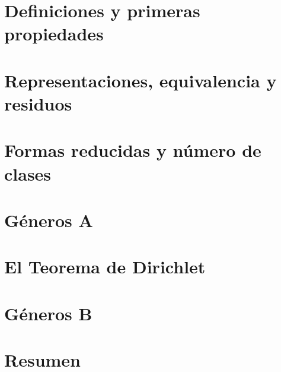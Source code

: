 \section{Definiciones y primeras propiedades}\label{sec:definiciones}


\section{Representaciones, equivalencia y residuos}\label{sec:representaciones}


\section{Formas reducidas y n\'umero de clases}\label{sec:reducidas}


\section{G\'eneros A}\label{sec:generos:a}


\section{El Teorema de Dirichlet}\label{sec:dirichlet}


\section{G\'eneros B}\label{sec:generos:b}


\section{Resumen}\label{sec:resumen}


